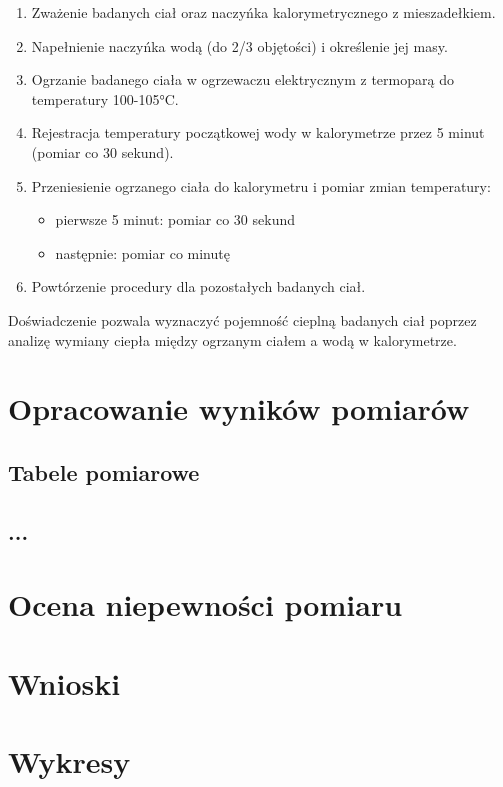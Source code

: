 \documentclass[a4paper,12pt]{article}
\begin{document}
\begin{enumerate}
    \item Zważenie badanych ciał oraz naczyńka kalorymetrycznego z mieszadełkiem.
    \item Napełnienie naczyńka wodą (do 2/3 objętości) i określenie jej masy.
    \item Ogrzanie badanego ciała w ogrzewaczu elektrycznym z termoparą do temperatury 100-105°C.
    \item Rejestracja temperatury początkowej wody w kalorymetrze przez 5 minut (pomiar co 30 sekund).
    \item Przeniesienie ogrzanego ciała do kalorymetru i pomiar zmian temperatury:
          \begin{itemize}
              \item pierwsze 5 minut: pomiar co 30 sekund
              \item następnie: pomiar co minutę
          \end{itemize}
    \item Powtórzenie procedury dla pozostałych badanych ciał.
\end{enumerate}

Doświadczenie pozwala wyznaczyć pojemność cieplną badanych ciał poprzez analizę wymiany ciepła między ogrzanym ciałem a wodą w kalorymetrze.


\section{Opracowanie wyników pomiarów}

\subsection{Tabele pomiarowe}

\subsection{...}

\section{Ocena niepewności pomiaru}

\section{Wnioski}

\section{Wykresy}



\end{document}

